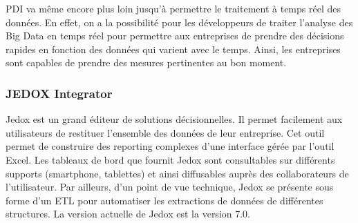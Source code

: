 \documentclass[12pt,a4wide,twoside]{report}
\begin{document}
		PDI va même encore plus loin jusqu'à permettre le traitement à temps réel des données. En effet, on a la possibilité pour les développeurs de traiter l'analyse des Big Data en temps réel pour permettre aux entreprises de prendre des décisions rapides en fonction des données qui varient avec le temps. Ainsi, les entreprises sont capables de prendre des mesures pertinentes au bon moment.


 \subsubsection{JEDOX Integrator}
Jedox est un grand éditeur de solutions décisionnelles. Il permet facilement aux utilisateurs de restituer l’ensemble des données de leur entreprise. Cet outil permet de construire des reporting complexes d’une interface gérée par l’outil Excel. Les tableaux de bord que fournit Jedox sont consultables sur différents supports (smartphone, tablettes) et ainsi diffusables auprès des collaborateurs de l’utilisateur.\newline
Par ailleurs, d’un point de vue technique, Jedox se présente sous forme d’un ETL pour automatiser les extractions de données de différentes structures.
La version actuelle de Jedox est la version 7.0.
\end{document}
